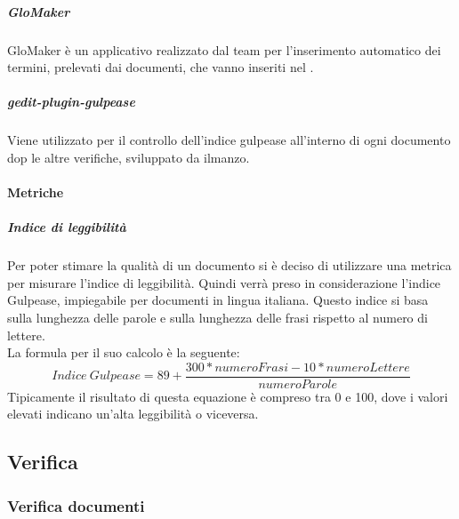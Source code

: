 \documentclass[../NormeDiProgetto_v4.0.0.tex]{subfiles}
\begin{document}
				\subparagraph{GloMaker}
				GloMaker è un applicativo realizzato dal team per l'inserimento automatico dei termini, prelevati dai documenti, che vanno inseriti nel \glossario.
			
				\subparagraph{gedit-plugin-gulpease}
				Viene utilizzato per il controllo dell'indice gulpease all'interno di ogni documento dop le altre verifiche, sviluppato da ilmanzo.
				

			\paragraph{Metriche}
				\subparagraph{Indice di leggibilità}
				Per poter stimare la qualità di un documento si è deciso di utilizzare una metrica per misurare l'indice di leggibilità. Quindi verrà preso in considerazione l'indice Gulpease, impiegabile per documenti in lingua italiana. Questo indice si basa sulla lunghezza delle parole e sulla lunghezza delle frasi rispetto al numero di lettere.\\
				La formula per il suo calcolo è la seguente:
				\begin{equation*}
					Indice \ Gulpease = 89 + \frac{300*numeroFrasi - 10*numeroLettere}{numeroParole}
				\end{equation*}
				Tipicamente il risultato di questa equazione è compreso tra 0 e 100, dove i valori elevati indicano un'alta leggibilità o viceversa.\\



	\subsection{Verifica}

		\subsubsection{Verifica documenti}
\end{document}

